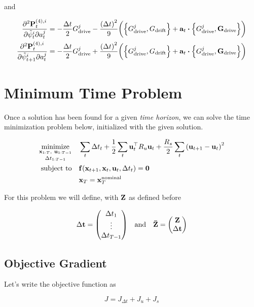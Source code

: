 \documentclass{article}
\newcommand{\isopsi}{\tilde \psi}
\begin{document}
and 

\begin{align}
  \pdv{\vb{P}_t^{(4), i}}{\isopsi_t^i}{a^j_t} &= -\frac{\Delta t}{2} G^j_{\text{drive}} - \frac{\qty(\Delta t)^2}{9}\bigg( \qty{G^j_{\text{drive}}, G_{\text{drift}}} + \vb{a}_t \vdot \qty{G^j_{\text{drive}}, \vb{G}_{\text{drive}}} \bigg)\\
  \pdv{\vb{P}_t^{(4), i}}{\isopsi_{t+1}^i}{a^j_t} &= -\frac{\Delta t}{2} G^j_{\text{drive}} + \frac{\qty(\Delta t)^2}{9}\bigg( \qty{G^j_{\text{drive}}, G_{\text{drift}}} + \vb{a}_t \vdot \qty{G^j_{\text{drive}}, \vb{G}_{\text{drive}}} \bigg)
\end{align}

\section{Minimum Time Problem}

Once a solution has been found for a given \textit{time horizon}, we can solve the time minimization problem below, initialized with the given solution.

\begin{align*}
  \underset{\Delta t_{1:T-1}}{\underset{\vb{x}_{1:T}, \ \vb{u}_{1:T-1}}{\text{minimize}}} & 
  \quad \sum_t \Delta t_t + \frac{1}{2} \sum_t \vb{u}_t^\top R_u \vb{u}_t + \frac{R_s}{2} \sum_t \qty(\vb{u}_{t+1} - \vb{u}_t)^2\\
  \text{subject to} & \quad \vb{f}(\vb{x}_{t+1}, \vb{x}_t, \vb{u}_t, \Delta t_t) = \vb{0}\\
  & \quad \vb{x}_T = \vb{x}^\text{nominal}_T
\end{align*}

For this problem we will define, with $\vb{Z}$ as defined before 

$$
  \Delta \vb{t} = \mqty(
    \Delta t_1 \\ 
    \vdots \\ 
    \Delta t_{T-1}
  )
  \quad \text{and} \quad
  \vb{\bar Z} = \mqty(\vb{Z} \\ \Delta \vb{t})
$$


\subsection{Objective Gradient}

Let's write the objective function as 

\begin{equation}
  J = J_{\Delta t} + J_u + J_s
\end{equation}
\end{document}
